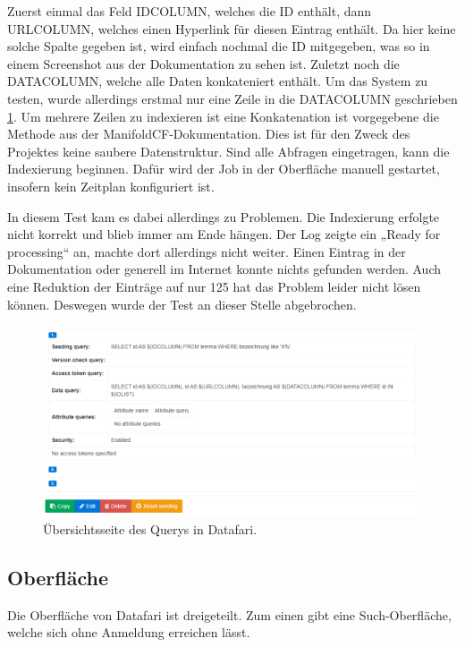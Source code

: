 Zuerst einmal das Feld IDCOLUMN, welches die ID enthält, dann URLCOLUMN, welches einen Hyperlink für diesen Eintrag enthält. Da hier keine solche Spalte gegeben ist, wird einfach nochmal die ID mitgegeben, was so in einem Screenshot aus der Dokumentation zu sehen ist. Zuletzt noch die DATACOLUMN, welche alle Daten konkateniert enthält. Um das System zu testen, wurde allerdings erstmal nur eine Zeile in die DATACOLUMN geschrieben \ref{img:datafariQuery}. Um mehrere Zeilen zu indexieren ist eine Konkatenation ist vorgegebene die Methode aus der ManifoldCF-Dokumentation. \cite[S.~97]{ApacheSoftwareFoundation.} Dies ist für den Zweck des Projektes keine saubere Datenstruktur.
Sind alle Abfragen eingetragen, kann die Indexierung beginnen. Dafür wird der Job in der Oberfläche manuell gestartet, insofern kein Zeitplan konfiguriert ist.

In diesem Test kam es dabei allerdings zu Problemen. Die Indexierung erfolgte nicht korrekt und blieb immer am Ende hängen. Der Log zeigte ein „Ready for processing“ an, machte dort allerdings nicht weiter. Einen Eintrag in der Dokumentation oder generell im Internet konnte nichts gefunden werden. Auch eine Reduktion der Einträge auf nur 125 hat das Problem leider nicht lösen können. Deswegen wurde der Test an dieser Stelle abgebrochen. 

\begin{figure}
	\centering
	\includegraphics[width=1\linewidth]{images/datafari_query.png}
	\caption{Übersichtsseite des Querys in Datafari.}
	\label{img:datafariQuery}
\end{figure}

\subsection{Oberfläche}

Die Oberfläche von Datafari ist dreigeteilt. Zum einen gibt eine Such-Oberfläche, welche sich ohne Anmeldung erreichen lässt. 

